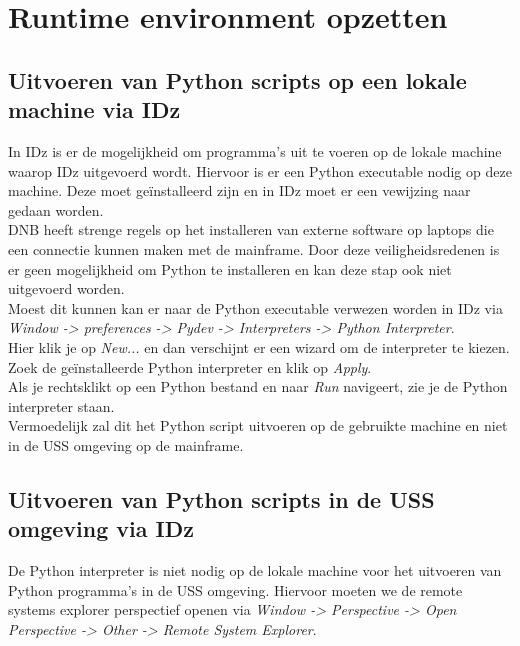 
\chapter{Runtime environment opzetten}
\label{ch:runtime-environment}
\section{Uitvoeren van Python scripts op een lokale machine via IDz}
In IDz is er de mogelijkheid om programma's uit te voeren op de lokale machine waarop IDz uitgevoerd wordt. Hiervoor is er een Python executable nodig op deze machine. Deze moet geïnstalleerd zijn en in IDz moet er een vewijzing naar gedaan worden. \\

DNB heeft strenge regels op het installeren van externe software op laptops die een connectie kunnen maken met de mainframe. Door deze veiligheidsredenen is er geen mogelijkheid om Python te installeren en kan deze stap ook niet uitgevoerd worden. \\

Moest dit kunnen kan er naar de Python executable verwezen worden in IDz via \textit{Window -> preferences -> Pydev -> Interpreters -> Python Interpreter}. \\
Hier klik je op \textit{New...} en dan verschijnt er een wizard om de interpreter te kiezen. Zoek de geïnstalleerde Python interpreter en klik op \textit{Apply}. \\

Als je rechtsklikt op een Python bestand en naar \textit{Run} navigeert, zie je de Python interpreter staan. \\
Vermoedelijk zal dit het Python script uitvoeren op de gebruikte machine en niet in de USS omgeving op de mainframe. 


\section{Uitvoeren van Python scripts in de USS omgeving via IDz}
De Python interpreter is niet nodig op de lokale machine voor het uitvoeren van Python programma's in de USS omgeving. Hiervoor moeten we de remote systems explorer perspectief openen via \textit{Window -> Perspective -> Open Perspective -> Other -> Remote System Explorer}. \\

